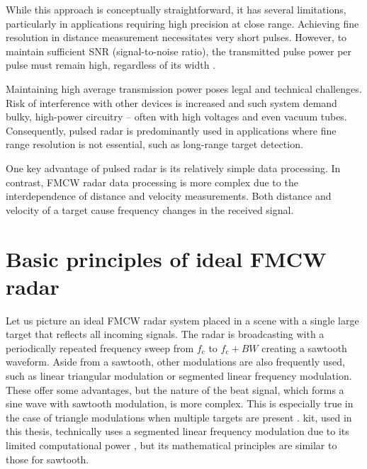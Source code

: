 While this approach is conceptually straightforward, it has several limitations, particularly in applications requiring high precision at close range.
Achieving fine resolution in distance measurement necessitates very short pulses.
However, to maintain sufficient SNR (signal-to-noise ratio), the transmitted pulse power per pulse must remain high, regardless of its width \cite{jankiraman2018}.

Maintaining high average transmission power poses legal and technical challenges.
Risk of interference with other devices is increased and such system demand bulky, high-power circuitry -- often with high voltages and even vacuum tubes.
Consequently, pulsed radar is predominantly used in applications where fine range resolution is not essential, such as long-range target detection.

One key advantage of pulsed radar is its relatively simple data processing.
In contrast, FMCW radar data processing is more complex due to the interdependence of distance and velocity measurements.
Both distance and velocity of a target cause frequency changes in the received signal.

\section{Basic principles of ideal FMCW radar}

Let us picture an ideal FMCW radar system placed in a scene with a single large target that reflects all incoming signals.
The radar is broadcasting with a periodically repeated frequency sweep from $f_\mathrm{c}$ to $f_\mathrm{c}+BW$ creating a sawtooth waveform.
Aside from a sawtooth, other modulations are also frequently used, such as linear triangular modulation or segmented linear frequency modulation.
These offer some advantages, but the nature of the beat signal, which forms a sine wave with sawtooth modulation, is more complex.
This is especially true in the case of triangle modulations when multiple targets are present \cite{jankiraman2018}.
\sirad kit, used in this thesis, technically uses a segmented linear frequency modulation due to its limited computational power \cite{siradPRO}, but its mathematical principles are similar to those for sawtooth.

